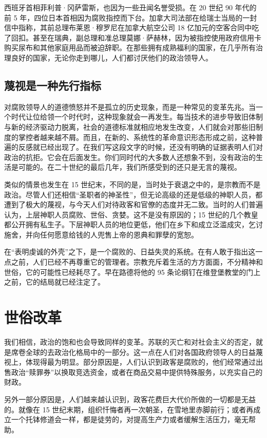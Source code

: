 西班牙首相菲利普·冈萨雷斯，也因为一些丑闻名誉受损。在 20 世纪 90 年代的前 5 年，四位日本首相因为腐败指控而下台。加拿大司法部在给瑞士当局的一封信中指称，其前总理布莱恩·穆罗尼在加拿大航空公司 18 亿加元的空客合同中吃了回扣。甚至在瑞典，副总理和准总理莫娜·萨赫林，因为被指控使用政府信用卡购买尿布和其他家庭用品而被迫辞职。在那些拥有成熟福利的国家，在几乎所有治理良好的国家，无论你走到哪儿，人们都讨厌他们的政治领导人。

\subsection{蔑视是一种先行指标}
对腐败领导人的道德愤怒并不是孤立的历史现象，而是一种常见的变革先兆。当一个时代让位给领一个时代时，这种现象就会一再发生。每当技术的进步导致旧体制与新的经济驱动力脱离，社会的道德标准就相应地发生改变，人们就会对那些旧制度的掌控者越来越不屑。而且，在新的、系统性的革命意识形态形成之前，这种普遍的反感就已经出现了。在我们写这段文字的时候，还没有明确的证据表明人们对政治的抗拒。它会在后面发生。你们同时代的大多数人还想象不到，没有政治的生活是可能的。在二十世纪的最后几年，我们所感受到的还只是无言的蔑视。

类似的情景也发生在 15 世纪末，不同的是，当时处于衰退之中的，是宗教而不是政治。尽管人们还相信“圣职者的神圣性”，但无论高级的还是低级的神职人员，都遭到了极大的蔑视，与今天人们对待政客和官僚的态度并无二致。当时的人们普遍认为，上层神职人员腐败、世俗、贪婪。这不是没有原因的；15 世纪的几个教皇都公开拥有私生子。下层神职人员的地位更低，他们在乡下和成立泛滥成灾，乞讨施舍，并向任何愿意给钱的人兜售上帝的恩典和罪孽的宽恕。

在“表明虔诚的外壳”之下，是一个腐败的、日益失灵的系统。在有人敢于指出这一点之前，人们已经不再尊重它的管理者。宗教充斥着生活的方方面面，不分精神和世俗，它的可能性已经耗尽了。早在路德将他的 95 条论纲钉在维登堡教堂的门上之前，它的结局就已经注定了。

\section{世俗改革}
我们相信，政治的饱和也会导致同样的变革。苏联的灭亡和对社会主义的否定，就是席卷全球的去政治化格局中的一部分。这一点在人们对各国政府领导人的日益蔑视上，体现得最为明显。部分原因是，人们认识到政客是腐败的，他们经常通过出售政治“赎罪券”以换取竞选资金，或者在商品交易中提供特殊服务，以充实自己的财政。

另外一部分原因是，人们越来越认识到，政客花费巨大代价所做的一切都是无益的。就像在 15 世纪末期，组织忏悔者再一次朝圣，在雪地里赤脚前行；或者再成立一个托钵修道会一样，都是徒劳的，对提高生产力或者缓解生活压力，毫无帮助。


